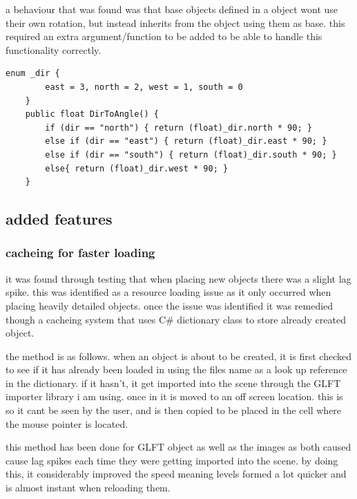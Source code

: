 a behaviour that was found was that base objects defined in a object wont use their own rotation, but instead inherits from the object using them as base. this required an extra argument/function to be added to be able to handle this functionality correctly. 

\begin{minipage}{\textwidth}
\begin{lstlisting}[language={[Sharp]C}, caption=direction definition and conversion label=clst:correctPlacment]
    enum _dir {
        east = 3, north = 2, west = 1, south = 0
    }
    public float DirToAngle() {
        if (dir == "north") { return (float)_dir.north * 90; }
        else if (dir == "east") { return (float)_dir.east * 90; }
        else if (dir == "south") { return (float)_dir.south * 90; }
        else{ return (float)_dir.west * 90; }
    }
\end{lstlisting}
\end{minipage}

\subsection{added features}
\subsubsection{cacheing for faster loading}
it was found through testing that when placing new objects there was a slight lag spike. this was identified as a resource loading issue as it only occurred when placing heavily detailed objects. once the issue was identified it was remedied though a cacheing system that uses C\# dictionary class to store already created object.

the method is as follows. when an object is about to be created, it is first checked to see if it has already been loaded in using the files name as a look up reference in the dictionary. if it hasn't, it get imported into the scene through the GLFT importer library i am using. once in it is moved to an off screen location. this is so it cant be seen by the user, and is then copied to be placed in the cell where the mouse pointer is located.

this method has been done for GLFT object as well as the images as both caused cause lag spikes each time they were getting imported into the scene. by doing this, it considerably improved the speed meaning levels formed a lot quicker and is almost instant when reloading them. 


